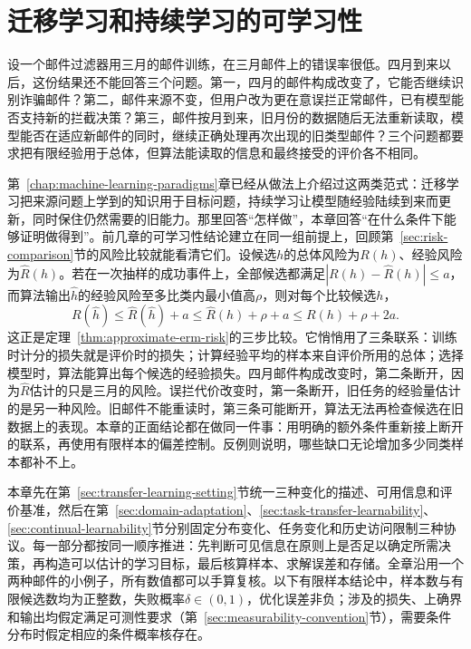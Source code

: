 \chapter{迁移学习和持续学习的可学习性}
\label{chap:transfer-learning-theory}

设一个邮件过滤器用三月的邮件训练，在三月邮件上的错误率很低。四月到来以后，这份结果还不能回答三个问题。第一，四月的邮件构成改变了，它能否继续识别诈骗邮件？第二，邮件来源不变，但用户改为更在意误拦正常邮件，已有模型能否支持新的拦截决策？第三，邮件按月到来，旧月份的数据随后无法重新读取，模型能否在适应新邮件的同时，继续正确处理再次出现的旧类型邮件？三个问题都要求把有限经验用于总体，但算法能读取的信息和最终接受的评价各不相同。

第~\ref{chap:machine-learning-paradigms}章已经从做法上介绍过这两类范式：迁移学习把来源问题上学到的知识用于目标问题，持续学习让模型随经验陆续到来而更新，同时保住仍然需要的旧能力。那里回答“怎样做”，本章回答“在什么条件下能够证明做得到”。前几章的可学习性结论建立在同一组前提上，回顾第~\ref{sec:risk-comparison}节的风险比较就能看清它们。设候选$h$的总体风险为$R(h)$、经验风险为$\widehat R(h)$。若在一次抽样的成功事件上，全部候选都满足$|R(h)-\widehat R(h)|\leq a$，而算法输出$\widehat h$的经验风险至多比类内最小值高$\rho$，则对每个比较候选$h$，
\begin{equation}
 R(\widehat h)\leq\widehat R(\widehat h)+a
 \leq\widehat R(h)+\rho+a
 \leq R(h)+\rho+2a.
 \label{eq:transfer-iid-comparison}
\end{equation}
这正是定理~\ref{thm:approximate-erm-risk}的三步比较。它悄悄用了三条联系：训练时计分的损失就是评价时的损失；计算经验平均的样本来自评价所用的总体；选择模型时，算法能算出每个候选的经验损失。四月邮件构成改变时，第二条断开，因为$\widehat R$估计的只是三月的风险。误拦代价改变时，第一条断开，旧任务的经验量估计的是另一种风险。旧邮件不能重读时，第三条可能断开，算法无法再检查候选在旧数据上的表现。本章的正面结论都在做同一件事：用明确的额外条件重新接上断开的联系，再使用有限样本的偏差控制。反例则说明，哪些缺口无论增加多少同类样本都补不上。

本章先在第~\ref{sec:transfer-learning-setting}节统一三种变化的描述、可用信息和评价基准，然后在第~\ref{sec:domain-adaptation}、\ref{sec:task-transfer-learnability}、\ref{sec:continual-learnability}节分别固定分布变化、任务变化和历史访问限制三种协议。每一部分都按同一顺序推进：先判断可见信息在原则上是否足以确定所需决策，再构造可以估计的学习目标，最后核算样本、求解误差和存储。全章沿用一个两种邮件的小例子，所有数值都可以手算复核。以下有限样本结论中，样本数与有限候选数均为正整数，失败概率$\delta\in(0,1)$，优化误差非负；涉及的损失、上确界和输出均假定满足可测性要求（第~\ref{sec:measurability-convention}节），需要条件分布时假定相应的条件概率核存在。

